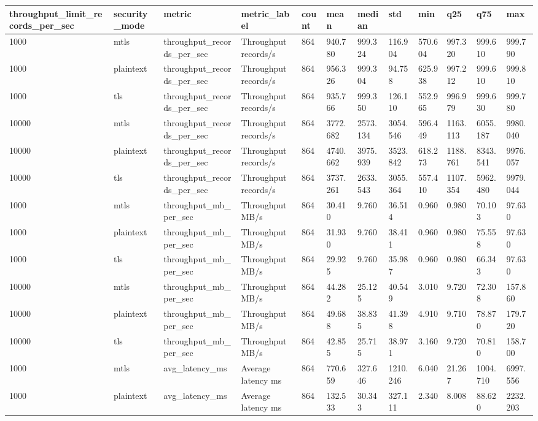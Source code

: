 \begin{longtable}{llllllllllll}
\hline
throughput\_limit\_records\_per\_sec & security\_mode & metric & metric\_label & count & mean & median & std & min & q25 & q75 & max \\
\hline
1000 & mtls & throughput\_records\_per\_sec & Throughput records/s & 864 & 940.780 & 999.324 & 116.904 & 570.604 & 997.320 & 999.610 & 999.790 \\
1000 & plaintext & throughput\_records\_per\_sec & Throughput records/s & 864 & 956.326 & 999.304 & 94.758 & 625.938 & 997.212 & 999.610 & 999.810 \\
1000 & tls & throughput\_records\_per\_sec & Throughput records/s & 864 & 935.766 & 999.350 & 126.110 & 552.965 & 996.979 & 999.630 & 999.780 \\
10000 & mtls & throughput\_records\_per\_sec & Throughput records/s & 864 & 3772.682 & 2573.134 & 3054.546 & 596.449 & 1163.113 & 6055.187 & 9980.040 \\
10000 & plaintext & throughput\_records\_per\_sec & Throughput records/s & 864 & 4740.662 & 3975.939 & 3523.842 & 618.273 & 1188.761 & 8343.541 & 9976.057 \\
10000 & tls & throughput\_records\_per\_sec & Throughput records/s & 864 & 3737.261 & 2633.543 & 3055.364 & 557.410 & 1107.354 & 5962.480 & 9979.044 \\
1000 & mtls & throughput\_mb\_per\_sec & Throughput MB/s & 864 & 30.410 & 9.760 & 36.514 & 0.960 & 0.980 & 70.103 & 97.630 \\
1000 & plaintext & throughput\_mb\_per\_sec & Throughput MB/s & 864 & 31.930 & 9.760 & 38.411 & 0.960 & 0.980 & 75.558 & 97.630 \\
1000 & tls & throughput\_mb\_per\_sec & Throughput MB/s & 864 & 29.925 & 9.760 & 35.987 & 0.960 & 0.980 & 66.343 & 97.630 \\
10000 & mtls & throughput\_mb\_per\_sec & Throughput MB/s & 864 & 44.282 & 25.125 & 40.549 & 3.010 & 9.720 & 72.308 & 157.860 \\
10000 & plaintext & throughput\_mb\_per\_sec & Throughput MB/s & 864 & 49.688 & 38.835 & 41.398 & 4.910 & 9.710 & 78.870 & 179.720 \\
10000 & tls & throughput\_mb\_per\_sec & Throughput MB/s & 864 & 42.855 & 25.715 & 38.971 & 3.160 & 9.720 & 70.810 & 158.700 \\
1000 & mtls & avg\_latency\_ms & Average latency ms & 864 & 770.659 & 327.646 & 1210.246 & 6.040 & 21.267 & 1004.710 & 6997.556 \\
1000 & plaintext & avg\_latency\_ms & Average latency ms & 864 & 132.533 & 30.343 & 327.111 & 2.340 & 8.008 & 88.620 & 2232.203 \\

\end{longtable}
